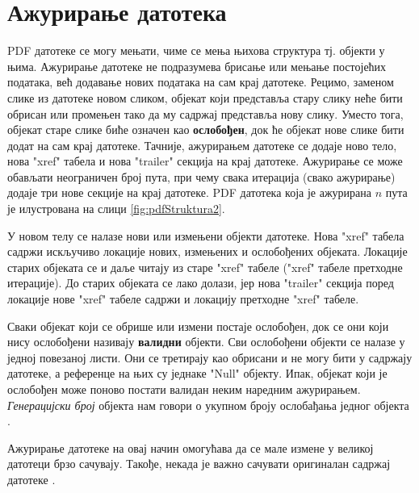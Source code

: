 \documentclass[12pt,oneside]{memoir}
\begin{document}
\section{Ажурирање датотека}
\label{sec:azuriranje}


PDF датотеке се могу мењати, чиме се мења њихова структура тј. објекти у њима. Ажурирање датотеке не подразумева брисање или мењање постојећих података, већ додавање нових података на сам крај датотеке. Рецимо, заменом слике из датотеке новом сликом, објекат који представља стару слику неће бити обрисан или промењен тако да му садржај представља нову слику. Уместо тога, објекат старе слике биће означен као \textbf{ослобођен}, док ће објекат нове слике бити додат на сам крај датотеке. Тачније, ажурирањем датотеке се додаје ново тело, нова "xref" табела и нова "trailer" секција на крај датотеке. Ажурирање се може обављати неограничен број пута, при чему свака итерација (свако ажурирање) додаје три нове секције на крај датотеке. PDF датотека која је ажурирана $n$ пута је илустрована на слици \ref{fig:pdfStruktura2}. 

У новом телу се налазе нови или измењени објекти датотеке. Нова "xref" табела садржи искључиво локације нових, измењених и ослобођених објеката. Локације старих објеката се и даље читају из старе "xref" табеле ("xref" табеле претходне итерације). До старих објеката се лако долази, јер нова "trailer" секција поред локације нове "xref" табеле садржи и локацију претходне "xref" табеле. 

Сваки објекат који се обрише или измени постаје ослобођен, док се они који нису ослобођени називају \textbf{валидни} објекти. Сви ослобођени објекти се налазе у једној повезаној листи. Они се третирају као обрисани и не могу бити у садржају датотеке, а референце на њих су једнаке "Null" објекту. Ипак, објекат који је ослобођен може поново постати валидан неким наредним ажурирањем. \textit{Генерацијски број} објекта нам говори о укупном броју ослобађања једног објекта \cite{PDFDoc, introToPdf, basicStrPdf}.

Ажурирање датотеке на овај начин омогућава да се мале измене у великој датотеци брзо сачувају. Такође, некада је важно сачувати оригиналан садржај датотеке \cite{PDFDoc}.
\end{document}
